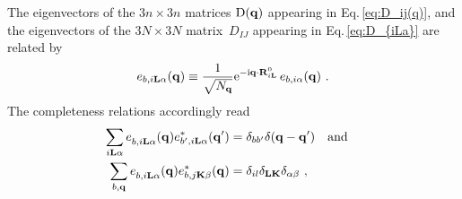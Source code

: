 The eigenvectors of the $3n \times 3n$ matrices $\mathrm D ({\bf q})$ appearing in Eq.\,\eqref{eq:D_ij(q)}, and the eigenvectors of the $3N \times 3N$ matrix~$D_{IJ}$ appearing in Eq.\,\eqref{eq:D_{iLa}} are related by
\begin{align}
	e_{b, i {\bf L} \alpha} ({\bf q})
		\equiv \frac{1}{\sqrt{N_{{\bf q}}}} {\rm e}^{- {\rm i} {\bf q}  \cdot {\bf R}^0_{i {\bf L}}} \, e_{b, i \alpha} ({\bf q})~.
\end{align}
The completeness relations accordingly read
\begin{align}
	\sum_{i \b L \alpha} \fD e_{b, i \b L \alpha} (\b q) e^\ast_{b', i \b L \alpha} (\b q') 
		&= \delta_{b b'} \delta (\b q - \b q') \quad \text{and} \quad \\
	\sum_{b, \b q} \fD e_{b, i \b L \alpha} (\b q) e^\ast_{b, j \b K \beta} (\b q)
		&= \delta_{il} \delta_{\b L \b K} \delta_{\alpha \beta}~,
	\label{eq:completeness.e_bq}
\end{align}

